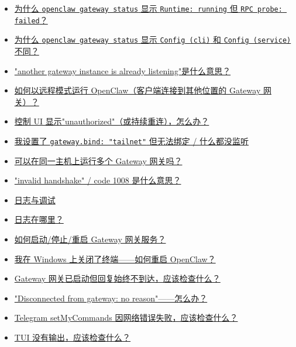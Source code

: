 \begin{itemize}
  \item \href{\#why-does-openclaw-gateway-status-say-runtime-running-but-rpc-probe-failed}{为什么 \texttt{openclaw gateway status} 显示 \texttt{Runtime: running} 但 \texttt{RPC probe: failed}？}
  \item \href{\#why-does-openclaw-gateway-status-show-config-cli-and-config-service-different}{为什么 \texttt{openclaw gateway status} 显示 \texttt{Config (cli)} 和 \texttt{Config (service)} 不同？}
  \item \href{\#what-does-another-gateway-instance-is-already-listening-mean}{"another gateway instance is already listening"是什么意思？}
  \item \href{\#how-do-i-run-openclaw-in-remote-mode-client-connects-to-a-gateway-elsewhere}{如何以远程模式运行 OpenClaw（客户端连接到其他位置的 Gateway 网关）？}
  \item \href{\#the-control-ui-says-unauthorized-or-keeps-reconnecting-what-now}{控制 UI 显示"unauthorized"（或持续重连），怎么办？}
  \item \href{\#i-set-gatewaybind-tailnet-but-it-cant-bind-nothing-listens}{我设置了 \texttt{gateway.bind: "tailnet"} 但无法绑定 / 什么都没监听}
  \item \href{\#can-i-run-multiple-gateways-on-the-same-host}{可以在同一主机上运行多个 Gateway 网关吗？}
  \item \href{\#what-does-invalid-handshake-code-1008-mean}{"invalid handshake" / code 1008 是什么意思？}
  \item \href{\#logging-and-debugging}{日志与调试}
  \item \href{\#where-are-logs}{日志在哪里？}
  \item \href{\#how-do-i-startstoprestart-the-gateway-service}{如何启动/停止/重启 Gateway 网关服务？}
  \item \href{\#i-closed-my-terminal-on-windows-how-do-i-restart-openclaw}{我在 Windows 上关闭了终端——如何重启 OpenClaw？}
  \item \href{\#the-gateway-is-up-but-replies-never-arrive-what-should-i-check}{Gateway 网关已启动但回复始终不到达，应该检查什么？}
  \item \href{\#disconnected-from-gateway-no-reason-what-now}{"Disconnected from gateway: no reason"——怎么办？}
  \item \href{\#telegram-setmycommands-fails-with-network-errors-what-should-i-check}{Telegram setMyCommands 因网络错误失败，应该检查什么？}
  \item \href{\#tui-shows-no-output-what-should-i-check}{TUI 没有输出，应该检查什么？}

\end{itemize}
